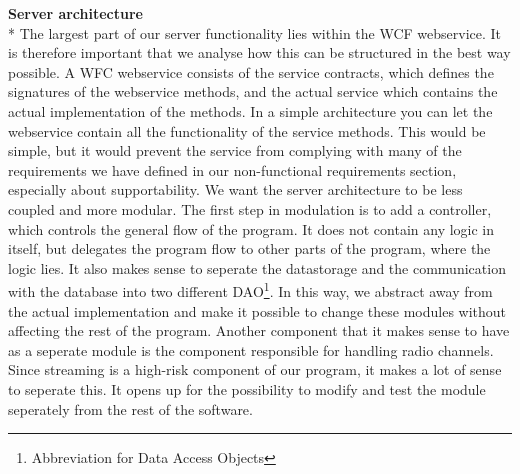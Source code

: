 \documentclass[a4paper,11pt,report]{article}
\begin{document}
\textbf{Server architecture} \\*
The largest part of our server functionality lies within the WCF webservice. It is therefore important that we analyse how this can be structured in the best way possible.
A WFC webservice consists of the service contracts, which defines the signatures of the webservice methods, and the actual service which contains the actual implementation of the methods. In a simple architecture you can let the webservice contain all the functionality of the service methods. This would be simple, but it would prevent the service from complying with many of the requirements we have defined in our non-functional requirements section, especially about supportability. We want the server architecture to be less coupled and more modular. The first step in modulation is to add a controller, which controls the general flow of the program. It does not contain any logic in itself, but delegates the program flow to other parts of the program, where the logic lies. It also makes sense to seperate the datastorage and the communication with the database into two different DAO\footnote{Abbreviation for Data Access Objects}. In this way, we abstract away from the actual implementation and make it possible to change these modules without affecting the rest of the program. Another component that it makes sense to have as a seperate module is the component responsible for handling radio channels. Since streaming is a high-risk component of our program, it makes a lot of sense to seperate this. It opens up for the possibility to modify and test the module seperately from the rest of the software. 
\end{document}
